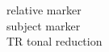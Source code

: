 \documentclass[output=paper]{langscibook}
\begin{document}
\begin{multicols}{2}
\begin{tabbing}
\RM{} \> relative marker \\
\SM{} \> subject marker\\
TR \> tonal reduction\\
\end{tabbing}
\end{multicols}

\printbibliography[heading=subbibliography,notkeyword=this]\label{sec:refs}
\end{document}
